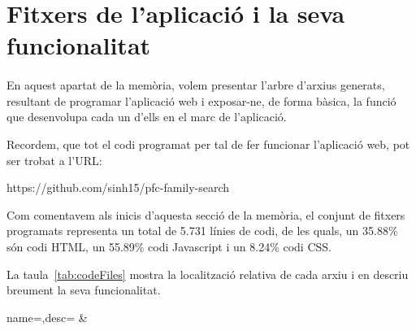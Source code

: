\section{Fitxers de l'aplicació i la seva funcionalitat}

    \paragraph{}
    En aquest apartat de la memòria, volem presentar l'arbre d'arxius generats, resultant de programar l'aplicació web i exposar-ne, de forma bàsica, la funció que desenvolupa cada un d'ells en el marc de l'aplicació.

    Recordem, que tot el codi programat per tal de fer funcionar l’aplicació web, pot ser trobat a l'URL:

    \begin{displayquote}
        https://github.com/sinh15/pfc-family-search
    \end{displayquote}

    Com comentavem als inicis d'aquesta secció de la memòria, el conjunt de fitxers programats representa un total de 5.731 línies de codi, de les quals, un 35.88\% són codi HTML, un 55.89\% codi Javascript i un 8.24\% codi CSS.

    La taula~\ref{tab:codeFiles} mostra la localització relativa de cada arxiu i en descriu breument la seva funcionalitat.

    \begin{center}
             {name=\name,desc=\desc}
             {\name&\desc}
     \end{center}
